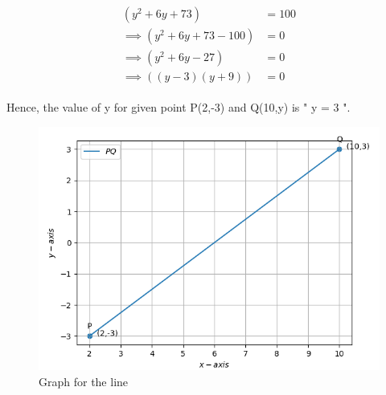 \documentclass[12pt]{article}
\providecommand{\brak}[1]{\ensuremath{\left(#1\right)}}
\begin{document}
\begin{enumerate}
    \begin{align}
	\begin{split}	                     
	\brak{y^2 + 6y + 73}&=100 \\
	\implies  
	\brak{y^2 + 6y + 73 - 100}& = 0 \\
	\implies 
	\brak{y^2 + 6y - 27}& = 0\\
    \implies
    \brak{(y-3)(y+9)}& = 0	
    \end{split}
    \end{align}
	
	
    Hence, the value of y for given point P(2,-3) and Q(10,y) is " y = 3 ".	
\hspace{3mm}
\begin{figure}[!h]
	\begin{center}
	\includegraphics[width=6in]{graph.png}	
	\end{center}
		
\caption{Graph for the line}
\label{fig:Fig}
\end{figure}
\end{enumerate}
\end{document}
